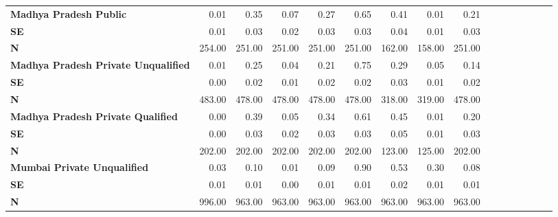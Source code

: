 \begin{tabular}{@{\extracolsep{5pt}}lrrrrrrrrrrrrrrr}
{\bf Madhya Pradesh Public} & 0.01\phantom{***} & 0.35\phantom{***} & 0.07\phantom{***} & 0.27\phantom{***} & 0.65\phantom{***} & 0.41\phantom{***} & 0.01\phantom{***} & 0.21\phantom{***} \\
{\bf SE} & 0.01\phantom{***} & 0.03\phantom{***} & 0.02\phantom{***} & 0.03\phantom{***} & 0.03\phantom{***} & 0.04\phantom{***} & 0.01\phantom{***} & 0.03\phantom{***} \\
{\bf N} & 254.00\phantom{***} & 251.00\phantom{***} & 251.00\phantom{***} & 251.00\phantom{***} & 251.00\phantom{***} & 162.00\phantom{***} & 158.00\phantom{***} & 251.00\phantom{***} \\
{\bf Madhya Pradesh Private Unqualified} & 0.01\phantom{***} & 0.25\phantom{***} & 0.04\phantom{***} & 0.21\phantom{***} & 0.75\phantom{***} & 0.29\phantom{***} & 0.05\phantom{***} & 0.14\phantom{***} \\
{\bf SE} & 0.00\phantom{***} & 0.02\phantom{***} & 0.01\phantom{***} & 0.02\phantom{***} & 0.02\phantom{***} & 0.03\phantom{***} & 0.01\phantom{***} & 0.02\phantom{***} \\
{\bf N} & 483.00\phantom{***} & 478.00\phantom{***} & 478.00\phantom{***} & 478.00\phantom{***} & 478.00\phantom{***} & 318.00\phantom{***} & 319.00\phantom{***} & 478.00\phantom{***} \\
{\bf Madhya Pradesh Private Qualified} & 0.00\phantom{***} & 0.39\phantom{***} & 0.05\phantom{***} & 0.34\phantom{***} & 0.61\phantom{***} & 0.45\phantom{***} & 0.01\phantom{***} & 0.20\phantom{***} \\
{\bf SE} & 0.00\phantom{***} & 0.03\phantom{***} & 0.02\phantom{***} & 0.03\phantom{***} & 0.03\phantom{***} & 0.05\phantom{***} & 0.01\phantom{***} & 0.03\phantom{***} \\
{\bf N} & 202.00\phantom{***} & 202.00\phantom{***} & 202.00\phantom{***} & 202.00\phantom{***} & 202.00\phantom{***} & 123.00\phantom{***} & 125.00\phantom{***} & 202.00\phantom{***} \\
{\bf Mumbai Private Unqualified} & 0.03\phantom{***} & 0.10\phantom{***} & 0.01\phantom{***} & 0.09\phantom{***} & 0.90\phantom{***} & 0.53\phantom{***} & 0.30\phantom{***} & 0.08\phantom{***} \\
{\bf SE} & 0.01\phantom{***} & 0.01\phantom{***} & 0.00\phantom{***} & 0.01\phantom{***} & 0.01\phantom{***} & 0.02\phantom{***} & 0.01\phantom{***} & 0.01\phantom{***} \\
{\bf N} & 996.00\phantom{***} & 963.00\phantom{***} & 963.00\phantom{***} & 963.00\phantom{***} & 963.00\phantom{***} & 963.00\phantom{***} & 963.00\phantom{***} & 963.00\phantom{***} \\

\end{tabular}
